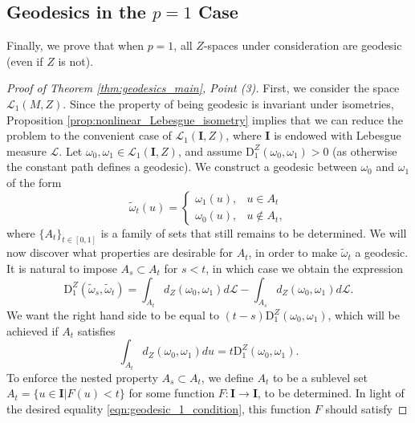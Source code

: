 \documentclass{article}
\theoremstyle{definition}
\newcommand{\dz}[1]{\mathrm{D}^Z_{#1}}
\begin{document}
\subsection{Geodesics in the \texorpdfstring{$p=1$}{p=1} Case}\label{subsec:p_equals_1}


Finally, we prove that when $p=1$, all $Z$-spaces under consideration are geodesic (even if $Z$ is not). 

\begin{proof}[Proof of Theorem \ref{thm:geodesics_main}, Point (3)]
    First, we consider the space $\mathcal{L}_1(M,Z)$. Since the property of being geodesic is invariant under isometries, Proposition \ref{prop:nonlinear_Lebesgue_isometry} implies that we can reduce the problem to the convenient case of $\mathcal{L}_1(\mathbf{I},Z)$, where $\mathbf{I}$ is endowed with Lebesgue measure $\mathscr{L}$. 
    Let $\omega_0,\omega_1 \in \mathcal{L}_1(\mathbf{I},Z)$, and assume $\dz{1}(\omega_0,\omega_1) > 0$ (as otherwise the constant path defines a geodesic). We construct a geodesic between $\omega_0$ and $\omega_1$ of the form
    \begin{equation}
        \tilde{\omega}_t(u) = \begin{cases} \omega_1(u), & u\in A_t\\ \omega_0(u), & u\notin A_t,\end{cases}
    \end{equation}
    where $\{A_t\}_{t \in [0,1]}$ is a family of sets that still remains to be determined. We will now discover what properties are desirable for $A_t$, in order to make $\tilde{\omega}_t$ a geodesic. It is natural to impose $A_s\subset A_t$ for  $s<t$, in which case we obtain the expression
    \begin{equation}
        \dz{1}(\tilde{\omega}_s,\tilde{\omega}_t) = \int_{A_t}d_Z(\omega_0,\omega_1)d\mathscr{L} - \int_{A_s}d_Z(\omega_0,\omega_1)d\mathscr{L}.
    \end{equation}
    We want the right hand side to be equal to $(t-s)\dz{1}(\omega_0,\omega_1)$, which will be achieved if $A_t$ satisfies
    \begin{equation}\label{eqn:geodesic_1_condition}
    \int_{A_t}d_Z(\omega_0,\omega_1)du = t\dz{1}(\omega_0,\omega_1).
    \end{equation}
    To enforce the nested property $A_s\subset A_t$, we define $A_t$ to be a sublevel set $A_t = \{u\in \mathbf{I}|F(u)< t\}$ for some function $F: \mathbf{I}\to\mathbf{I}$, to be determined. In light of the desired equality \eqref{eqn:geodesic_1_condition}, this function $F$ should satisfy

\end{proof}
\end{document}
